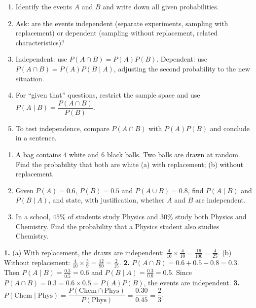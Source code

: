 \documentclass[11pt]{article}
\begin{document}
\begin{methode}
\begin{enumerate}
\item Identify the events $A$ and $B$ and write down all given probabilities.
\item Ask: are the events independent (separate experiments, sampling with replacement) or dependent (sampling without replacement, related characteristics)?
\item Independent: use $P(A\cap B)=P(A)P(B)$. Dependent: use $P(A\cap B)=P(A)P(B\mid A)$, adjusting the second probability to the new situation.
\item For ``given that'' questions, restrict the sample space and use $P(A\mid B)=\dfrac{P(A\cap B)}{P(B)}$.
\item To test independence, compare $P(A\cap B)$ with $P(A)P(B)$ and conclude in a sentence.
\end{enumerate}
\end{methode}

\begin{exercice}[Practice]
\begin{enumerate}
\item A bag contains $4$ white and $6$ black balls. Two balls are drawn at random. Find the probability that both are white (a) with replacement; (b) without replacement.
\item Given $P(A)=0.6$, $P(B)=0.5$ and $P(A\cup B)=0.8$, find $P(A\mid B)$ and $P(B\mid A)$, and state, with justification, whether $A$ and $B$ are independent.
\item In a school, $45\%$ of students study Physics and $30\%$ study both Physics and Chemistry. Find the probability that a Physics student also studies Chemistry.
\end{enumerate}
\end{exercice}

\begin{corrige}[Exercise 1]
\textbf{1.} (a) With replacement, the draws are independent: $\tfrac{4}{10}\times\tfrac{4}{10}=\tfrac{16}{100}=\tfrac{4}{25}$. (b) Without replacement: $\tfrac{4}{10}\times\tfrac{3}{9}=\tfrac{12}{90}=\tfrac{2}{15}$.
\textbf{2.} $P(A\cap B)=0.6+0.5-0.8=0.3$. Then $P(A\mid B)=\tfrac{0.3}{0.5}=0.6$ and $P(B\mid A)=\tfrac{0.3}{0.6}=0.5$. Since $P(A\cap B)=0.3=0.6\times0.5=P(A)P(B)$, the events are independent.
\textbf{3.} $P(\text{Chem}\mid\text{Phys})=\dfrac{P(\text{Chem}\cap\text{Phys})}{P(\text{Phys})}=\dfrac{0.30}{0.45}=\dfrac{2}{3}$.
\end{corrige}
\end{document}
